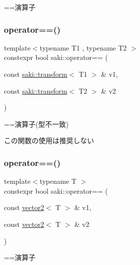 ==演算子 

\mbox{\label{namespacesaki_afde7d962261485c2054cd1a98ed337ed}} 
\subsubsection{\texorpdfstring{operator==()}{operator==()}\hspace{0.1cm}{\footnotesize\ttfamily [5/14]}}
{\footnotesize\ttfamily template$<$typename T1 , typename T2 $>$ \\
constexpr bool saki\+::operator== (\begin{DoxyParamCaption}\item[{const \mbox{\hyperlink{classsaki_1_1transform}{saki\+::transform}}$<$ T1 $>$ \&}]{v1,  }\item[{const \mbox{\hyperlink{classsaki_1_1transform}{saki\+::transform}}$<$ T2 $>$ \&}]{v2 }\end{DoxyParamCaption})}



==演算子(型不一致) 

この関数の使用は推奨しない \mbox{\label{namespacesaki_a2aafc5056183a1a522b89497ee3439e9}} 
\subsubsection{\texorpdfstring{operator==()}{operator==()}\hspace{0.1cm}{\footnotesize\ttfamily [6/14]}}
{\footnotesize\ttfamily template$<$typename T $>$ \\
constexpr bool saki\+::operator== (\begin{DoxyParamCaption}\item[{const \mbox{\hyperlink{classsaki_1_1vector2}{vector2}}$<$ T $>$ \&}]{v1,  }\item[{const \mbox{\hyperlink{classsaki_1_1vector2}{vector2}}$<$ T $>$ \&}]{v2 }\end{DoxyParamCaption})}



==演算子 

\mbox{\label{namespacesaki_a5f3eb3ebd6a3ee43771849069101153f}} 
